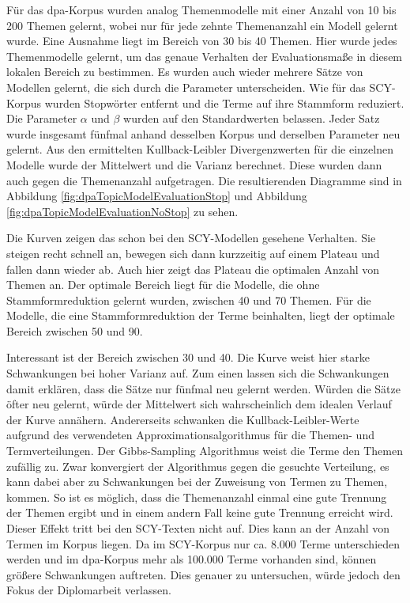 Für das dpa-Korpus wurden analog Themenmodelle mit einer Anzahl von 10 bis 200 Themen gelernt, wobei nur für jede zehnte Themenanzahl ein Modell gelernt wurde. Eine Ausnahme liegt im Bereich von 30 bis 40 Themen. Hier wurde jedes Themenmodelle gelernt, um das genaue Verhalten der Evaluationsmaße in diesem lokalen Bereich zu bestimmen. Es wurden auch wieder mehrere Sätze von Modellen gelernt, die sich durch die Parameter unterscheiden. Wie für das SCY-Korpus wurden Stopwörter entfernt und die Terme auf ihre Stammform reduziert. Die Parameter $\alpha$ und $\beta$ wurden auf den Standardwerten belassen. Jeder Satz wurde insgesamt fünfmal anhand desselben Korpus und derselben Parameter neu gelernt. Aus den ermittelten Kullback-Leibler Divergenzwerten für die einzelnen Modelle wurde der Mittelwert und die Varianz berechnet. Diese wurden dann auch gegen die Themenanzahl aufgetragen. Die resultierenden Diagramme sind in Abbildung \ref{fig:dpaTopicModelEvaluationStop} und Abbildung \ref{fig:dpaTopicModelEvaluationNoStop} zu sehen.

Die Kurven zeigen das schon bei den SCY-Modellen gesehene Verhalten. Sie steigen recht schnell an, bewegen sich dann kurzzeitig auf einem Plateau und fallen dann wieder ab. Auch hier zeigt das Plateau die optimalen Anzahl von Themen an. Der optimale Bereich liegt für die Modelle, die ohne Stammformreduktion gelernt wurden, zwischen 40 und 70 Themen. Für die Modelle, die eine Stammformreduktion der Terme beinhalten, liegt der optimale Bereich zwischen 50 und 90. 

Interessant ist der Bereich zwischen 30 und 40. Die Kurve weist hier starke Schwankungen bei hoher Varianz auf. Zum einen lassen sich die Schwankungen damit erklären, dass die Sätze nur fünfmal neu gelernt werden. Würden die Sätze öfter neu gelernt, würde der Mittelwert sich wahrscheinlich dem idealen Verlauf der Kurve annähern. Andererseits schwanken die Kullback-Leibler-Werte aufgrund des verwendeten Approximationsalgorithmus für die Themen- und Termverteilungen. Der Gibbs-Sampling Algorithmus weist die Terme den Themen zufällig zu. Zwar konvergiert der Algorithmus gegen die gesuchte Verteilung, es kann dabei aber zu Schwankungen bei der Zuweisung von Termen zu Themen, kommen. So ist es möglich, dass die Themenanzahl einmal eine gute Trennung der Themen ergibt und in einem andern Fall keine gute Trennung erreicht wird. Dieser Effekt tritt bei den SCY-Texten nicht auf. Dies kann an der Anzahl von Termen im Korpus liegen. Da im SCY-Korpus nur ca. 8.000 Terme unterschieden werden und im dpa-Korpus mehr als 100.000 Terme vorhanden sind, können größere Schwankungen auftreten. Dies genauer zu untersuchen, würde jedoch den Fokus der Diplomarbeit verlassen. 


